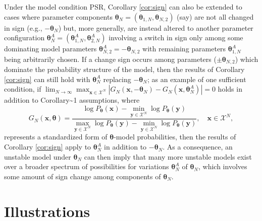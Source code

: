 \documentclass[]{article}
\theoremstyle{definition}
\let\BeginKnitrBlock\begin \let\EndKnitrBlock\end
\begin{document}
\BeginKnitrBlock{remark}
\iffalse{} {Remark. } \fi{}Under the model condition PSR, Corollary
\ref{cor:sign} can also be extended to cases where parameter components
\(\boldsymbol \theta_N =(\boldsymbol \theta_{1,N}, \boldsymbol \theta_{N,2})\)
(say) are not all changed in sign (e.g., \(-\boldsymbol \theta_N\)) but,
more generally, are instead altered to another parameter configuration
\(\boldsymbol \theta_{N}^A = ( \boldsymbol \theta_{1,N}^A, \boldsymbol \theta_{2,N}^A )\)
involving a switch in sign only among some dominating model parameters
\(\boldsymbol \theta_{N,2}^A=- \boldsymbol \theta_{N,2}\) with remaining
parameters \(\boldsymbol \theta_{1,N}^A\) being arbitrarily chosen. If a
change sign occurs among parameters (\(\pm \boldsymbol \theta_{N,2}\))
which dominate the probability structure of the model, then the results
of Corollary \ref{cor:sign} can still hold with
\(\boldsymbol \theta_{N}^A\) replacing \(-\boldsymbol \theta_N\); as an
example of one sufficient condition, if
\(\lim_{N\to \infty} \max_{\boldsymbol x \in \mathcal{X}^N} |G_N(\boldsymbol x, -\boldsymbol \theta_{N}) - G_N(\boldsymbol x, \boldsymbol \theta_{N}^A)|=0\)
holds in addition to Corollary\textasciitilde{}1 assumptions, where \[
G_N(\boldsymbol x, \boldsymbol \theta) =   \frac{\log P_{\boldsymbol \theta}(\boldsymbol x) - \min_{\boldsymbol y \in\mathcal{X}^N}\log P_{\boldsymbol \theta}(\boldsymbol y) }{\max_{\boldsymbol y \in\mathcal{X}^N}\log P_{\boldsymbol \theta}(\boldsymbol y)  - \min_{\boldsymbol y \in\mathcal{X}^N}\log P_{\boldsymbol \theta}(\boldsymbol y) }, \quad \boldsymbol x \in\mathcal{X}^N,
\] represents a standardized form of \(\boldsymbol \theta\)-model
probabilities, then the results of Corollary \ref{cor:sign} apply to
\(\boldsymbol \theta_{N}^A\) in addition to \(-\boldsymbol \theta_N\).
As a consequence, an unstable model under \(\boldsymbol \theta_N\) can
then imply that many more unstable models exist over a broader spectrum
of possibilities for variations \(\boldsymbol \theta_{N}^A\) of
\(\boldsymbol \theta_N\), which involves some amount of sign change
among components of \(\boldsymbol \theta_N\).
\EndKnitrBlock{remark}

\section{Illustrations}\label{illustrations}
\end{document}
